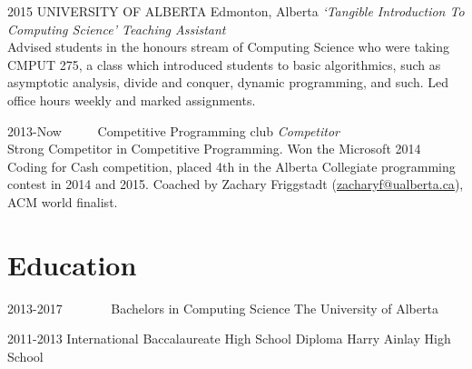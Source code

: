 \documentclass{friggeri-cv} %
\begin{document}
\begin{entrylist}

\entry
{2015}
{UNIVERSITY OF ALBERTA}
{Edmonton, Alberta}
{\emph{`Tangible Introduction To Computing Science' Teaching Assistant} \\
Advised students in the honours stream of Computing Science who were taking CMPUT 275, a class which introduced students to basic algorithmics, such as asymptotic analysis, divide and conquer, dynamic programming, and such. Led office hours weekly and marked assignments.}


\entry
{2013-Now\ \ \ \ \ }
{Competitive Programming club}
{}
{\emph{Competitor} \\
Strong Competitor in Competitive Programming. Won the Microsoft 2014 Coding for Cash competition, placed 4th in the Alberta Collegiate programming contest in 2014 and 2015. Coached by Zachary Friggstadt (\href{mailto:zacharyf@ualberta.ca}{zacharyf@ualberta.ca}), ACM world finalist.}

\end{entrylist}


\section{Education}

\begin{entrylist}


\entry
{2013-2017\ \ \ \ \ \ \ }
{Bachelors {\normalfont in Computing Science}}
{The University of Alberta}


\entry
{2011-2013}
{International Baccalaureate {\normalfont High School Diploma}}
{Harry Ainlay High School}


\end{entrylist}

\end{document}
